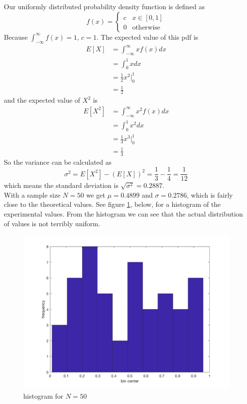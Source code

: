 \documentclass[11pt]{article}
\begin{document}
\subparagraph*{}
Our uniformly distributed probability density function is defined as
\begin{equation*}
	f(x) = \begin{cases}
				c & x \in [0,1] \\
				0 & \text{otherwise}
		   \end{cases}
\end{equation*}
Because $\int_{-\infty}^\infty f(x) = 1$, $c=1$. The expected value of this pdf is
\begin{align*}
	E[X] &= \int_{-\infty}^\infty xf(x)dx \\
	&= \int_0^1xdx \\
	&= \frac{1}{2}x^2\big|_0^1 \\
	&= \frac{1}{2}
\end{align*}
and the expected value of $X^2$ is
\begin{align*}
	E[X^2] &= \int_{-\infty}^\infty x^2f(x)dx \\
	&= \int_0^1 x^2dx \\
	&= \frac{1}{3}x^3\big|_0^1 \\
	&= \frac{1}{3}
\end{align*}
So the variance can be calculated as
\begin{equation*}
	\sigma^2 = E[X^2] - (E[X])^2 = \frac{1}{3} - \frac{1}{4} = \frac{1}{12}
\end{equation*}
which means the standard deviation is $\sqrt{\sigma^2} = 0.2887$. \\
With a sample size $N=50$ we get $\mu=0.4899$ and $\sigma=0.2786$, which is fairly close to the theoretical values. See figure \ref{5_plot1}, below, for a histogram of the experimental values. From the histogram we can see that the actual distribution of values is not terribly uniform.

\begin{figure}[h!]
	\centering
	\includegraphics[width=0.6\linewidth]{5_plot1.png}
	\caption{histogram for $N=50$}
	\label{5_plot1}
\end{figure}
\end{document}
